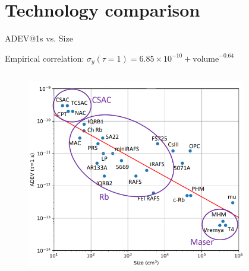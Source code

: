 \section{Technology comparison}

\begin{frame}{ADEV@1s vs. Size}

    Empirical correlation\footnotemark[1]: $\sigma_y(\tau=1) = 6.85 \times 10^{-10} + \text{volume}^{-0.64}$

    \begin{columns}[c, onlytextwidth]

        \begin{column}{0.7\textwidth}

            \begin{figure}
                \centering
                \includegraphics[width=0.9\textwidth]{img/ADEV-vs-Size.png}
            \end{figure}

        \end{column}

        \begin{column}{0.3\textwidth}


\end{column}
\end{columns}
\end{frame}
